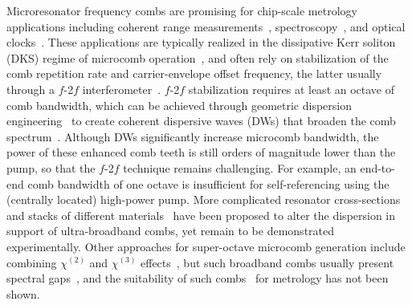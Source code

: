 \documentclass[reprint,superscriptaddress, amsmath,amssymb,pra, aps,floatfix,longbibliography]{revtex4-1}
\begin{document}
Microresonator frequency combs are promising for chip-scale metrology applications including coherent range measurements~\cite{riemensberger_massively_2020}, spectroscopy~\cite{picque_frequency_2019}, and optical clocks~\cite{yu_tuning_2019,newman_architecture_2019}. These applications are typically realized in the dissipative Kerr soliton (DKS) regime of microcomb operation~\cite{herr_dissipative_2016}, and often rely on stabilization of the comb repetition rate and carrier-envelope offset frequency, the latter usually through a $f$-2$f$ interferometer~\cite{udem_optical_2002,diddams_optical_2020}. $f$-2$f$ stabilization requires at least an octave of comb bandwidth, which can be achieved through geometric dispersion engineering~\cite{coen_modeling_2012, okawachi_bandwidth_2014} to create coherent dispersive waves (DWs) that broaden the comb spectrum~\cite{brasch_photonic_2016,li_stably_2017, pfeiffer_octave-spanning_2017,karpov_photonic_2018,yu_tuning_2019}. Although DWs significantly increase microcomb bandwidth, the power of these enhanced comb teeth is still orders of magnitude lower than the pump, so that the $f$-2$f$ technique remains challenging. For example, an end-to-end comb bandwidth of one octave is insufficient for self-referencing using the (centrally located) high-power pump. More complicated resonator cross-sections~\cite{moille_phased-locked_2018} and stacks of different materials~\cite{zhang_silicon_2012,dorche_advanced_2020} have been proposed to alter the dispersion in support of ultra-broadband combs, yet remain to be demonstrated experimentally. Other approaches for super-octave microcomb generation include combining $\chi^{(2)}$ and $\chi^{(3)}$ effects~\cite{chen_chaos-assisted_2020}, but such broadband combs usually present spectral gaps~\cite{szabados_frequency_2020}, and the suitability of such combs~\cite{chen_chaos-assisted_2020, hendry_experimental_2020, bruch_pockels_2020} for metrology has not been shown.\\
%
\end{document}
